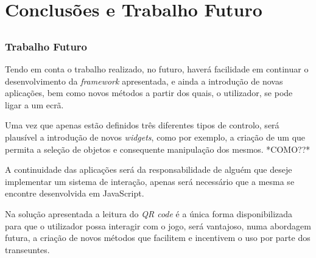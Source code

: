 \chapter{Conclusões e Trabalho Futuro} \label{chap:concl}

\section*{}


	
\subsection*{Trabalho Futuro}

Tendo em conta o trabalho realizado, no futuro, haverá facilidade em continuar o desenvolvimento da \textit{framework} apresentada, e ainda a introdução de novas aplicações, bem como novos métodos a partir dos quais, o utilizador, se pode ligar a um ecrã.

Uma vez que apenas estão definidos três diferentes tipos de controlo, será plausível a introdução de novos \textit{widgets}, como por exemplo, a criação de um que permita a seleção de objetos e consequente manipulação dos mesmos. *COMO??*

A continuidade das aplicações será da responsabilidade de alguém que deseje implementar um sistema de interação, apenas será necessário que a mesma se encontre desenvolvida em JavaScript.

Na solução apresentada a leitura do \textit{QR code} é a única forma disponibilizada para que o utilizador possa interagir com o jogo, será vantajoso, numa abordagem futura, a criação de novos métodos que facilitem e incentivem o uso por parte dos transeuntes.



